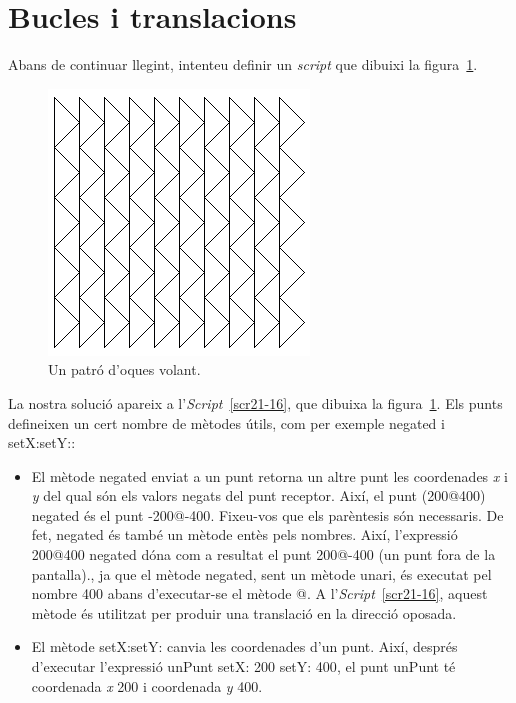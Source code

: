 \section{Bucles i translacions}
Abans de continuar llegint, intenteu definir un \emph{script} que dibuixi la figura~\ref{fig2104}.
\begin{figure}[h!]
\begin{center}
\includegraphics[scale=0.4]{Imatges/figura21-4.png}
\end{center}
\caption{Un patró d'oques volant.}
\label{fig2104}
\end{figure}

La nostra solució apareix a l'\emph{Script}~\ref{scr21-16}, que dibuixa la figura~\ref{fig2104}. Els punts defineixen un cert nombre de mètodes útils, com per exemple \textsf{negated} i \textsf{setX:setY:}:
\begin{itemize}
\item El mètode \textsf{negated} enviat a un punt retorna un altre punt les coordenades \emph{x} i \emph{y} del qual són els valors negats  del punt receptor. Així, el punt \textsf{(200@400) negated} és el punt \textsf{-200@-400}. Fixeu-vos que els parèntesis són necessaris. De fet, \textsf{negated} és també un mètode entès pels nombres. Així, l'expressió \textsf{200@400 negated} dóna com a resultat el punt \textsf{200@-400} (un punt fora de la pantalla)., ja que el mètode \textsf{negated}, sent un mètode unari, és executat pel nombre \textsf{400} abans d'executar-se el mètode \textsf{@}. A l'\emph{Script}~\ref{scr21-16}, aquest mètode és utilitzat per produir una translació en la direcció oposada.
\item El mètode \textsf{setX:setY:} canvia les coordenades d'un punt. Així, després d'executar l'expressió \textsf{unPunt setX: 200 setY: 400}, el punt \textsf{unPunt} té coordenada \emph{x} \textsf{200} i coordenada \emph{y} \textsf{400}. 
\end{itemize}

